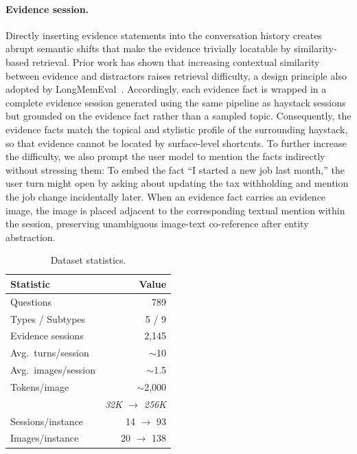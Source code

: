 \documentclass{llmxive}
\begin{document}
\paragraph{Evidence session.}
Directly inserting evidence statements into the conversation history creates abrupt semantic shifts that make the evidence trivially locatable by similarity-based retrieval. Prior work has shown that increasing contextual similarity between evidence and distractors raises retrieval difficulty, a design principle also adopted by LongMemEval~\cite{wu2025longmemevalbenchmarkingchatassistants}. Accordingly, each evidence fact is wrapped in a complete evidence session generated using the same pipeline as haystack sessions but grounded on the evidence fact rather than a sampled topic. Consequently, the evidence facts match the topical and stylistic profile of the surrounding haystack, so that evidence cannot be located by surface-level shortcuts. To further increase the difficulty, we also prompt the user model to mention the facts indirectly without stressing them: To embed the fact “I started a new job last month,” the user turn might open by asking about updating the tax withholding and mention the job change incidentally later. When an evidence fact carries an evidence image, the image is placed adjacent to the corresponding textual mention within the session, preserving unambiguous image-text co-reference after entity abstraction.

\begin{table}[t]
\centering
  \vspace{-12pt}
  \small
  \begin{tabular}{@{}lr@{}}
  \toprule
  \textbf{Statistic} & \textbf{Value} \\
  \midrule
  Questions           & 789 \\
  Types / Subtypes    & 5 / 9 \\
  Evidence sessions   & 2{,}145 \\
  Avg.\ turns/session & $\sim$10 \\
  Avg.\ images/session & $\sim$1.5 \\
  Tokens/image        & $\sim$2{,}000 \\
  \midrule
                      & \footnotesize\textit{32K $\to$ 256K} \\
  Sessions/instance   & 14 $\to$ 93 \\
  Images/instance     & 20 $\to$ 138 \\
  \bottomrule
  \end{tabular}
  \vspace{-8pt}

\caption{\small Dataset statistics.}
\label{tab:dataset_stats}
\end{table}
\end{document}
